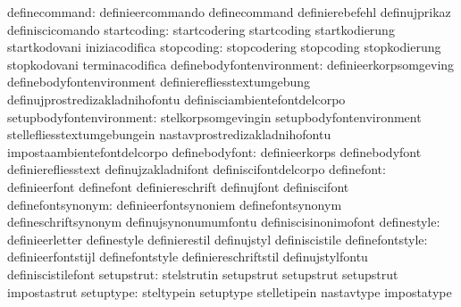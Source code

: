                    definecommand: definieercommando                definecommand
                                  definierebefehl                  definujprikaz
                                  definiscicomando
                     startcoding: startcodering                    startcoding
                                  startkodierung                   startkodovani
                                  iniziacodifica
                      stopcoding: stopcodering                     stopcoding
                                  stopkodierung                    stopkodovani
                                  terminacodifica
       definebodyfontenvironment: definieerkorpsomgeving           definebodyfontenvironment
                                  definierefliesstextumgebung      definujprostredizakladnihofontu
                                  definisciambientefontdelcorpo
        setupbodyfontenvironment: stelkorpsomgevingin              setupbodyfontenvironment
                                  stellefliesstextumgebungein      nastavprostredizakladnihofontu
                                  impostaambientefontdelcorpo
                  definebodyfont: definieerkorps                   definebodyfont
                                  definierefliesstext              definujzakladnifont
                                  definiscifontdelcorpo
                      definefont: definieerfont                    definefont
                                  definiereschrift                 definujfont
                                  definiscifont
               definefontsynonym: definieerfontsynoniem            definefontsynonym
                                  defineschriftsynonym             definujsynonumumfontu
                                  definiscisinonimofont
                     definestyle: definieerletter                  definestyle
                                  definierestil                    definujstyl
                                  definiscistile
                 definefontstyle: definieerfontstijl               definefontstyle
                                  definiereschriftstil             definujstylfontu
                                  definiscistilefont
                      setupstrut: stelstrutin                      setupstrut
                                  setupstrut                       setupstrut
                                  impostastrut
                       setuptype: steltypein                       setuptype
                                  stelletipein                     nastavtype
                                  impostatype
